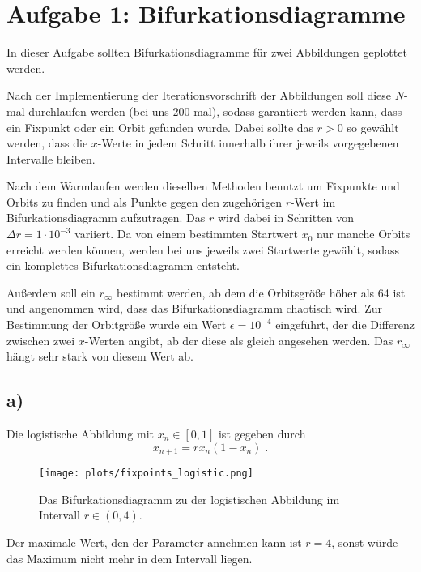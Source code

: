 \setcounter{secnumdepth}{0}
\newpage
\section{Aufgabe 1: Bifurkationsdiagramme}
\label{sec:auf1}
In dieser Aufgabe sollten Bifurkationsdiagramme für zwei Abbildungen geplottet werden.

Nach der Implementierung der Iterationsvorschrift der Abbildungen soll diese $N$-mal durchlaufen werden (bei uns 200-mal), sodass garantiert werden kann, dass ein Fixpunkt oder ein Orbit gefunden wurde. Dabei sollte das $r>0$ so gewählt werden, dass die $x$-Werte in jedem Schritt innerhalb ihrer jeweils vorgegebenen Intervalle bleiben.

Nach dem Warmlaufen werden dieselben Methoden benutzt um Fixpunkte und Orbits zu finden und als Punkte gegen den zugehörigen $r$-Wert im Bifurkationsdiagramm aufzutragen. Das $r$ wird dabei in Schritten von $\Delta r = 1 \cdot 10^{-3}$ variiert. Da von einem bestimmten Startwert $x_0$ nur manche Orbits erreicht werden können, werden bei uns jeweils zwei Startwerte gewählt, sodass ein komplettes Bifurkationsdiagramm entsteht.

Außerdem soll ein $r_{\infty}$ bestimmt werden, ab dem die Orbitsgröße höher als 64 ist und angenommen wird, dass das Bifurkationsdiagramm chaotisch wird. Zur Bestimmung der Orbitgröße wurde ein Wert $\epsilon = 10^{-4}$ eingeführt, der die Differenz zwischen zwei $x$-Werten angibt, ab der diese als gleich angesehen werden. Das $r_{\infty}$ hängt sehr stark von diesem Wert ab.

\subsection{a)}
    Die logistische Abbildung mit $x_n \in [0, 1]$ ist gegeben durch
    \begin{equation}
        x_{n+1} = r x_n (1 - x_n) \;.
    \end{equation}
    
    \begin{figure}[H]
        \centering
        \texttt{[image: plots/fixpoints\_logistic.png]} \vspace{-0.3cm}
        \caption{Das Bifurkationsdiagramm zu der logistischen Abbildung im Intervall $r \in (0, 4)$.}
        \label{fig:fixpoints_logistic}
    \end{figure}
    \FloatBarrier
    
    Der maximale Wert, den der Parameter annehmen kann ist $r=4$, sonst würde das Maximum nicht mehr in dem Intervall liegen.
    
